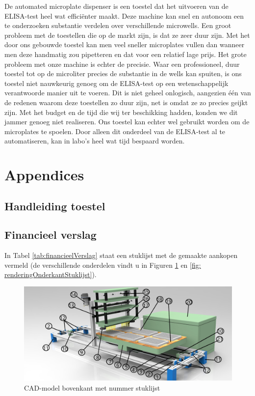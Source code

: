 \documentclass[a4paper,twoside,kulak]{kulakreport} %
\begin{document}
De automated microplate dispenser is een toestel dat het uitvoeren van de ELISA-test heel wat efficiënter maakt. Deze machine kan snel en autonoom een te onderzoeken substantie verdelen over verschillende microwells. Een groot probleem met de toestellen die op de markt zijn, is dat ze zeer duur zijn. Met het door ons gebouwde toestel kan men veel sneller microplates vullen dan wanneer men deze handmatig zou pipetteren en dat voor een relatief lage prijs. Het grote probleem met onze machine is echter de precisie. Waar een professioneel, duur toestel tot op de microliter precies de substantie in de wells kan spuiten, is ons toestel niet nauwkeurig genoeg om de ELISA-test op een wetenschappelijk verantwoorde manier uit te voeren. Dit is niet geheel onlogisch, aangezien één van de redenen waarom deze toestellen zo duur zijn, net is omdat ze zo precies geijkt zijn. Met het budget en de tijd die wij ter beschikking hadden, konden we dit jammer genoeg niet realiseren. Ons toestel kan echter wel gebruikt worden om de microplates te spoelen. Door alleen dit onderdeel van de ELISA-test al te automatiseren, kan in labo's heel wat tijd bespaard worden.

\clearpage
\nocite{wikipedia,LabX}



\chapter*{Appendices}

\section*{Handleiding toestel}



\section*{Financieel verslag}
\label{Appendix: Financieel verslag}

In Tabel \ref{tab:financieelVerslag} staat een stuklijst met de gemaakte aankopen vermeld (de verschillende onderdelen vindt u in Figuren \ref{fig: renderingBovenkantStuklijst} en \ref{fig: renderingOnderkantStuklijst}). 


\begin{figure}[h]
	\centering
	\includegraphics[width=\textwidth]{renderingBovenaanStuklijst.png}
	\caption{CAD-model bovenkant met nummer stuklijst}
	\label{fig: renderingBovenkantStuklijst}
	
\end{figure} 
\end{document}
